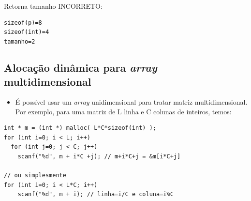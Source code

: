 \documentclass[12pt,a4paper]{article}
\providecommand{\tightlist}{%
      \setlength{\itemsep}{0pt}\setlength{\parskip}{0pt}}
\begin{document}
Retorna tamanho INCORRETO:

\begin{verbatim}
sizeof(p)=8
sizeof(int)=4
tamanho=2
\end{verbatim}

    \hypertarget{alocauxe7uxe3o-dinuxe2mica-para-array-multidimensional}{%
\subsection{\texorpdfstring{Alocação dinâmica para \emph{array}
multidimensional}{Alocação dinâmica para array multidimensional}}\label{alocauxe7uxe3o-dinuxe2mica-para-array-multidimensional}}

    \begin{itemize}
\tightlist
\item
  É possível usar um \emph{array} unidimensional para tratar matriz
  multidimensional. Por exemplo, para uma matriz de L linha e C colunas
  de inteiros, temos:
\end{itemize}

\begin{verbatim}
int * m = (int *) malloc( L*C*sizeof(int) );
for (int i=0; i < L; i++) 
  for (int j=0; j < C; j++) 
    scanf("%d", m + i*C +j); // m+i*C+j = &m[i*C+j]

// ou simplesmente
for (int i=0; i < L*C; i++) 
    scanf("%d", m + i); // linha=i/C e coluna=i%C
\end{verbatim}
\end{document}
